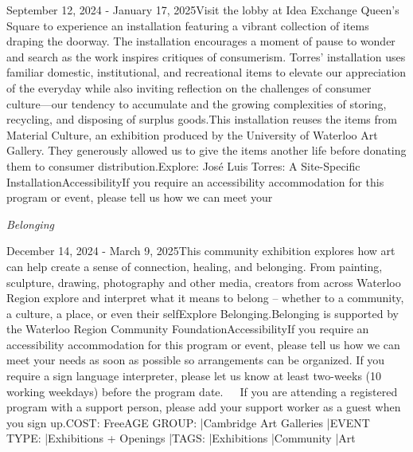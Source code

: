 \documentclass[letterpaper, 10pt]{article}
\newcommand{\subtitle}[1]{\textit{\large #1}\vspace{0.5em}}
\newcommand{\articlecontent}[1]{\small #1\vspace{1em}}
\begin{document}
\begin{multicols}{2}
{
\vspace{10px}

September 12, 2024 - January 17, 2025Visit the lobby at Idea Exchange Queen's Square to experience an installation featuring a vibrant collection of items draping the doorway. The installation encourages a moment of pause to wonder and search as the work inspires critiques of consumerism. Torres’ installation uses familiar domestic, institutional, and recreational items to elevate our appreciation of the everyday while also inviting reflection on the challenges of consumer culture—our tendency to accumulate and the growing complexities of storing, recycling, and disposing of surplus goods.This installation reuses the items from Material Culture, an exhibition produced by the University of Waterloo Art Gallery. They generously allowed us to give the items another life before donating them to consumer distribution.Explore: José Luis Torres: A Site-Specific InstallationAccessibilityIf you require an accessibility accommodation for this program or event, please tell us how we can meet your
}
\vspace{10px}

\subtitle{Belonging}

\articlecontent{

\qrcode[height=1.5cm]{https://ideaexchange.libnet.info/event/12094536}
\vspace{10px}

December 14, 2024 - March 9, 2025This community exhibition explores how art can help create a sense of connection, healing, and belonging. From painting, sculpture, drawing, photography and other media, creators from across Waterloo Region explore and interpret what it means to belong – whether to a community, a culture, a place, or even their selfExplore Belonging.Belonging is supported by the Waterloo Region Community FoundationAccessibilityIf you require an accessibility accommodation for this program or event, please tell us how we can meet your needs as soon as possible so arrangements can be organized. If you require a sign language interpreter, please let us know at least two-weeks (10 working weekdays) before the program date.   If you are attending a registered program with a support person, please add your support worker as a guest when you sign up.COST: FreeAGE GROUP: |Cambridge Art Galleries |EVENT TYPE: |Exhibitions + Openings |TAGS: |Exhibitions |Community |Art
}
\vspace{10px}


\end{multicols}
\end{document}
